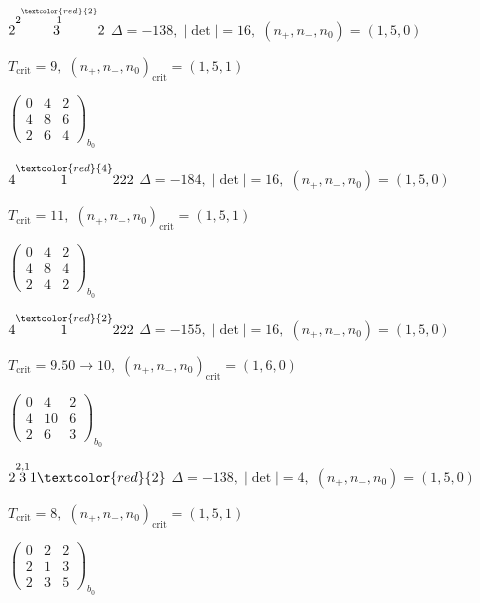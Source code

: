 \documentclass[10pt]{article}
\begin{document}
$2\overset{2\overset{\textcolor{red}{2}}{1}}{3}2$ \quad $\Delta=-138,\; |\det|=16,\; (n_+,n_-,n_0)=(1,5,0)$

\hspace{1em}$T_{\text{crit}}=9,\; (n_+,n_-,n_0)_{\text{crit}}=(1,5,1)$

\hspace{2em}$\left(\begin{smallmatrix}0 & 4 & 2 \\ 4 & 8 & 6 \\ 2 & 6 & 4\end{smallmatrix}\right)_{\!b_0}$

\smallskip

$4\overset{\textcolor{red}{4}}{1}222$ \quad $\Delta=-184,\; |\det|=16,\; (n_+,n_-,n_0)=(1,5,0)$

\hspace{1em}$T_{\text{crit}}=11,\; (n_+,n_-,n_0)_{\text{crit}}=(1,5,1)$

\hspace{2em}$\left(\begin{smallmatrix}0 & 4 & 2 \\ 4 & 8 & 4 \\ 2 & 4 & 2\end{smallmatrix}\right)_{\!b_0}$

$4\overset{\textcolor{red}{2}}{1}222$ \quad $\Delta=-155,\; |\det|=16,\; (n_+,n_-,n_0)=(1,5,0)$

\hspace{1em}$T_{\text{crit}}=9.50 \to 10,\; (n_+,n_-,n_0)_{\text{crit}}=(1,6,0)$

\hspace{2em}$\left(\begin{smallmatrix}0 & 4 & 2 \\ 4 & 10 & 6 \\ 2 & 6 & 3\end{smallmatrix}\right)_{\!b_0}$

\smallskip

$2\overset{2,1}{3}1\textcolor{red}{2}$ \quad $\Delta=-138,\; |\det|=4,\; (n_+,n_-,n_0)=(1,5,0)$

\hspace{1em}$T_{\text{crit}}=8,\; (n_+,n_-,n_0)_{\text{crit}}=(1,5,1)$

\hspace{2em}$\left(\begin{smallmatrix}0 & 2 & 2 \\ 2 & 1 & 3 \\ 2 & 3 & 5\end{smallmatrix}\right)_{\!b_0}$
\end{document}
